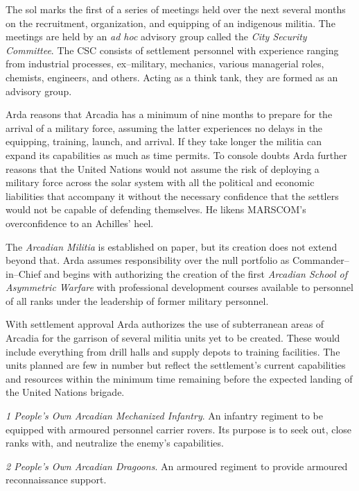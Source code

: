 The sol marks the first of a series of meetings held over the next several months on the recruitment, organization, and equipping of an indigenous militia. The meetings are held by an {\it ad hoc} advisory group called the {\it City Security Committee}. The CSC consists of settlement personnel with experience ranging from industrial processes, ex--military, mechanics, various managerial roles, chemists, engineers, and others. Acting as a think tank, they are formed as an advisory group.

Arda reasons that Arcadia has a minimum of nine months to prepare for the arrival of a military force, assuming the latter experiences no delays in the equipping, training, launch, and arrival. If they take longer the militia can expand its capabilities as much as time permits. To console doubts Arda further reasons that the United Nations would not assume the risk of deploying a military force across the solar system with all the political and economic liabilities that accompany it without the necessary confidence that the settlers would not be capable of defending themselves. He likens MARSCOM's overconfidence to an Achilles' heel.

The {\it Arcadian Militia} is established on paper, but its creation does not extend beyond that. Arda assumes responsibility over the null portfolio as Commander--in--Chief and begins with authorizing the creation of the first {\it Arcadian School of Asymmetric Warfare} with professional development courses available to personnel of all ranks under the leadership of former military personnel.
\StopTimelineDate

With settlement approval Arda authorizes the use of subterranean areas of Arcadia for the garrison of several militia units yet to be created. These would include everything from drill halls and supply depots to training facilities. The units planned are few in number but reflect the settlement's current capabilities and resources within the minimum time remaining before the expected landing of the United Nations brigade.

\startitemize[4]
\item {\it 1 People's Own Arcadian Mechanized Infantry}. An infantry regiment to be equipped with armoured personnel carrier rovers. Its purpose is to seek out, close ranks with, and neutralize the enemy's capabilities.

\item {\it 2 People's Own Arcadian Dragoons}. An armoured regiment to provide armoured reconnaissance support.

